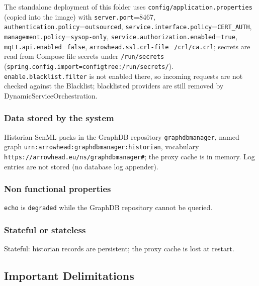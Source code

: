 \documentclass[a4paper]{arrowhead}
\begin{document}
The standalone deployment of this folder uses \texttt{config/\allowbreak{}application.\allowbreak{}properties} (copied into the image) with \texttt{server.\allowbreak{}port}=8467, \texttt{authentication.\allowbreak{}policy}=\texttt{outsourced}, \texttt{service.\allowbreak{}interface.\allowbreak{}policy}=\texttt{CERT\_AUTH}, \texttt{management.\allowbreak{}policy}=\texttt{sysop-\allowbreak{}only}, \texttt{service.\allowbreak{}authorization.\allowbreak{}enabled}=\texttt{true}, \texttt{mqtt.\allowbreak{}api.\allowbreak{}enabled}=\texttt{false}, \texttt{arrowhead.\allowbreak{}ssl.\allowbreak{}crl-\allowbreak{}file}=\texttt{/\allowbreak{}crl/\allowbreak{}ca.\allowbreak{}crl}; secrets are read from Compose file secrets under \texttt{/\allowbreak{}run/\allowbreak{}secrets} (\texttt{spring.\allowbreak{}config.\allowbreak{}import=\allowbreak{}configtree:\allowbreak{}/\allowbreak{}run/\allowbreak{}secrets/}). \texttt{enable.\allowbreak{}blacklist.\allowbreak{}filter} is not enabled there, so incoming requests are not checked against the Blacklist; blacklisted providers are still removed by Dynamic\allowbreak{}Service\allowbreak{}Orchestration.

\subsubsection{Data stored by the system}

Historian SenML packs in the GraphDB repository \texttt{graphdbmanager}, named graph \texttt{urn:\allowbreak{}arrowhead:\allowbreak{}graphdbmanager:\allowbreak{}historian}, vocabulary \texttt{https://\allowbreak{}arrowhead.eu/\allowbreak{}ns/\allowbreak{}graphdbmanager\#}; the proxy cache is in memory. Log entries are not stored (no database log appender).

\subsubsection{Non functional properties}

\texttt{echo} is \texttt{degraded} while the GraphDB repository cannot be queried.

\subsubsection{Stateful or stateless}

Stateful: historian records are persistent; the proxy cache is lost at restart.

\subsection{Important Delimitations}
\label{sec:delimitations}
\end{document}
